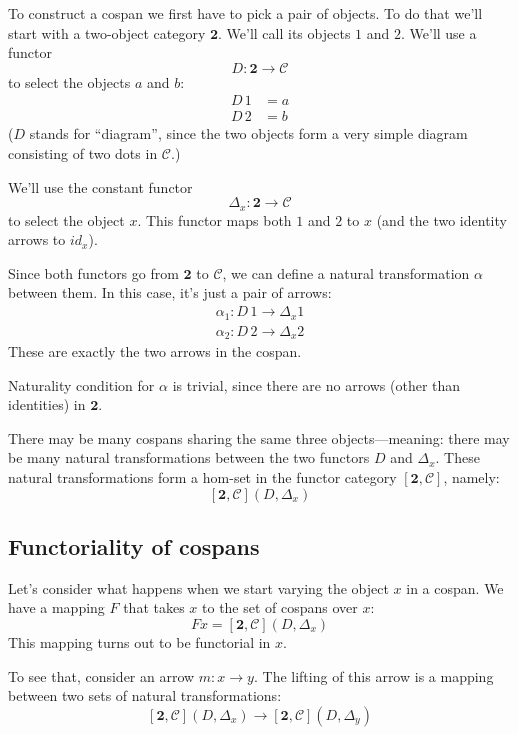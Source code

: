 \documentclass[DaoFP]{subfiles}
\begin{document}
To construct a cospan we first have to pick a pair of objects. To do that we'll start with a two-object category $\mathbf{2}$. We'll call its objects $1$ and $2$. 
We'll use a functor 
\[ D \colon \mathbf{2} \to \mathcal{C}\]
to select the objects $a$ and $b$: 
\begin{align*}
D\, 1 &= a \\
D\, 2 &= b 
\end{align*}
($D$ stands for ``diagram'', since the two objects form a very simple diagram consisting of two dots in $\mathcal{C}$.)

We'll use the constant functor 
\[ \Delta_x \colon \mathbf{2} \to \mathcal{C} \]
to select the object $x$. This functor maps both $1$ and $2$ to $x$ (and the two identity arrows to $id_x$).

Since both functors go from $\mathbf{2}$ to $\mathcal{C}$, we can define a natural transformation $\alpha$ between them. In this case, it's just a pair of arrows:
\begin{align*}
\alpha_1 \colon D \, 1 \to \Delta_x 1 \\
\alpha_2 \colon D \, 2 \to \Delta_x 2
\end{align*}
These are exactly the two arrows in the cospan. 

Naturality condition for $\alpha$ is trivial, since there are no arrows (other than identities) in $\mathbf{2}$.

There may be many cospans sharing the same three objects---meaning: there may be many natural transformations between the two functors $D$ and  $\Delta_x$. These natural transformations form a hom-set in the functor category $[\mathbf{2}, \mathcal{C}]$, namely:
\[ [\mathbf{2}, \mathcal{C}](D, \Delta_x) \]

\subsection{Functoriality of cospans}

Let's consider what happens when we start varying the object $x$ in a cospan. We have a mapping $F$ that takes $x$ to the set of cospans over $x$:
\[ F x = [\mathbf{2}, \mathcal{C}](D, \Delta_x) \]
This mapping turns out to be functorial in $x$.

To see that, consider an arrow $m \colon x \to y$. The lifting of this arrow is a mapping between two sets of natural transformations:
\[ [\mathbf{2}, \mathcal{C}](D, \Delta_x) \to [\mathbf{2}, \mathcal{C}](D, \Delta_{y}) \] 
 
\end{document}
